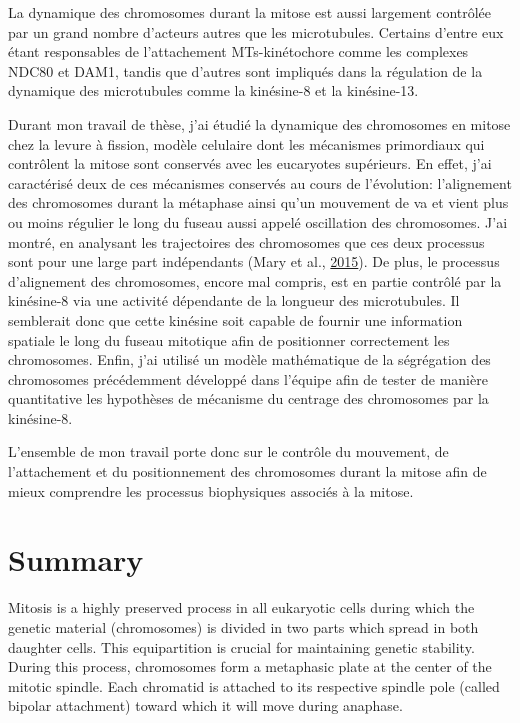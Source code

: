 \documentclass[12pt,a4paper,twoside,openright]{book}
\begin{document}
La dynamique des chromosomes durant la mitose est aussi largement
contrôlée par un grand nombre d'acteurs autres que les microtubules.
Certains d'entre eux étant responsables de l'attachement MTs-kinétochore
comme les complexes NDC80 et DAM1, tandis que d'autres sont impliqués
dans la régulation de la dynamique des microtubules comme la kinésine-8
et la kinésine-13.

Durant mon travail de thèse, j'ai étudié la dynamique des chromosomes en
mitose chez la levure à fission, modèle celulaire dont les mécanismes
primordiaux qui contrôlent la mitose sont conservés avec les eucaryotes
supérieurs. En effet, j'ai caractérisé deux de ces mécanismes conservés
au cours de l'évolution: l'alignement des chromosomes durant la
métaphase ainsi qu'un mouvement de va et vient plus ou moins régulier le
long du fuseau aussi appelé oscillation des chromosomes. J'ai montré, en
analysant les trajectoires des chromosomes que ces deux processus sont
pour une large part indépendants (Mary et al.,
\protect\hyperlink{ref-Mary2015}{2015}). De plus, le processus
d'alignement des chromosomes, encore mal compris, est en partie contrôlé
par la kinésine-8 via une activité dépendante de la longueur des
microtubules. Il semblerait donc que cette kinésine soit capable de
fournir une information spatiale le long du fuseau mitotique afin de
positionner correctement les chromosomes. Enfin, j'ai utilisé un modèle
mathématique de la ségrégation des chromosomes précédemment développé
dans l'équipe afin de tester de manière quantitative les hypothèses de
mécanisme du centrage des chromosomes par la kinésine-8.

L'ensemble de mon travail porte donc sur le contrôle du mouvement, de
l'attachement et du positionnement des chromosomes durant la mitose afin
de mieux comprendre les processus biophysiques associés à la mitose.

\cleardoublepage
\clearpage\null

\section*{Summary}

Mitosis is a highly preserved process in all eukaryotic cells during
which the genetic material (chromosomes) is divided in two parts which
spread in both daughter cells. This equipartition is crucial for
maintaining genetic stability. During this process, chromosomes form a
metaphasic plate at the center of the mitotic spindle. Each chromatid is
attached to its respective spindle pole (called bipolar attachment)
toward which it will move during anaphase.
\end{document}
